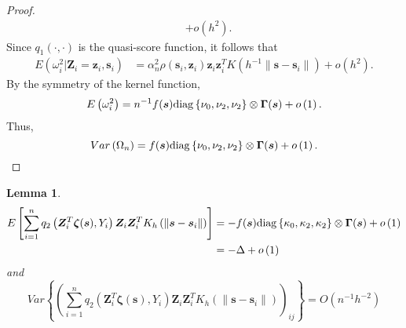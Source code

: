 \documentclass[authoryear,review, 12pt]{elsarticle}
\newtheorem{lem}{Lemma}
\begin{document}
\begin{proof}
\begin{align*}
 & +o\left(h^{2}\right).
\end{align*}
Since $q_{1}\left(\cdot,\cdot\right)$ is the quasi-score function,
it follows that 
\begin{align*}
E\left(\omega_{i}^{2}|\bm{Z}_{i}=\bm{z}_{i},\bm{s}_{i}\right) &= \alpha_{n}^{2}\rho(\bm{s}_{i},\bm{z}_{i})\bm{z}_{i}\bm{z}_{i}^{T}K\left(h^{-1}\|\bm{s}-\bm{s}_{i}\|\right)+o\left(h^{2}\right).
\end{align*}
By the symmetry of the kernel function,
\[
E\left(\omega_{i}^{2}\right)=n^{-1}f(\bm{s}){\rm diag}\left\{ \nu_{0},\nu_{2},\nu_{2}\right\} \otimes\bm{\Gamma}(\bm{s})+o\left(1\right).
\]
Thus, 
\[
Var\left(\Omega_{n}\right)=f(\bm{s}){\rm diag}\left\{ \nu_{0},\nu_{2},\nu_{2}\right\} \otimes\bm{\Gamma}(\bm{s})+o\left(1\right).
\]
\end{proof}
\begin{lem}
\label{lemma:delta}
\begin{align*}
E\left[\sum_{i=1}^{n}q_{2}\left(\bm{Z}_{i}^{T}\bm{\zeta}(\bm{s}),Y_{i}\right)\bm{Z}_{i}\bm{Z}_{i}^{T}K_{h}\left(\|\bm{s}-\bm{s}_{i}\|\right)\right] &= -f(\bm{s}){\rm diag}\left\{ \kappa_{0},\kappa_{2},\kappa_{2}\right\} \otimes\bm{\Gamma}(\bm{s})+o\left(1\right)\\
&= -\Delta+o\left(1\right)
\end{align*}
and
\[
Var\left\{ \left(\sum_{i=1}^{n}q_{2}\left(\bm{Z}_{i}^{T}\bm{\zeta}(\bm{s}),Y_{i}\right)\bm{Z}_{i}\bm{Z}_{i}^{T}K_{h}\left(\|\bm{s}-\bm{s}_{i}\|\right)\right)_{ij}\right\} =O\left(n^{-1}h^{-2}\right)
\]
\end{lem}
\end{document}
